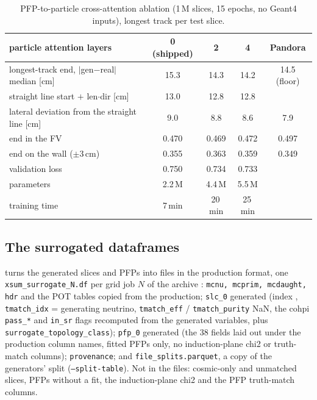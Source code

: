 \documentclass[11pt]{article}
\newcommand{\real}{Pandora}
\begin{document}
\begin{table}[h]\centering\small
\begin{tabular}{lcccc}\toprule
particle attention layers & 0 (shipped) & 2 & 4 & \real{} \\\midrule
longest-track end, $|$gen$-$real$|$ median [cm] & 15.3 & 14.3 & 14.2 & 14.5 (floor) \\
\quad straight line start $+$ len$\cdot$dir [cm] & 13.0 & 12.8 & 12.8 & \\
lateral deviation from the straight line [cm] & 9.0 & 8.8 & 8.6 & 7.9 \\
end in the FV & 0.470 & 0.469 & 0.472 & 0.497 \\
end on the wall ($\pm3$\,cm) & 0.355 & 0.363 & 0.359 & 0.349 \\
validation loss & 0.750 & 0.734 & 0.733 & \\
parameters & 2.2\,M & 4.4\,M & 5.5\,M & \\
training time & 7\,min & 20\,min & 25\,min & \\\bottomrule
\end{tabular}
\caption{PFP-to-particle cross-attention ablation (1\,M slices, 15 epochs, no Geant4 inputs), longest track per test slice.}\label{tab:attn}\end{table}
\small\normalsize
\FloatBarrier

\subsection{The surrogated dataframes}
\label{sec:dataset}

 turns the generated slices and PFPs into files in the production
format, one \texttt{xsum\_surrogate\_N.df} per grid job $N$ of the archive :
\texttt{mcnu, mcprim, mcdaught, hdr} and the POT tables copied from the production; \texttt{slc\_0} generated
(index , \texttt{tmatch\_idx} = generating neutrino,
\texttt{tmatch\_eff} / \texttt{tmatch\_purity} NaN, the cohpi \texttt{pass\_*} and \texttt{in\_sr} flags
recomputed from the generated variables, plus \texttt{surrogate\_topology\_class}); \texttt{pfp\_0} generated
(the 38 fields laid out under the production column names, fitted PFPs only, no induction-plane chi2 or
truth-match columns); \texttt{provenance}; and \texttt{file\_splits.parquet}, a copy of the generators' split
(\texttt{--split-table}). Not in the files: cosmic-only and unmatched slices, PFPs without a fit, the
induction-plane chi2 and the PFP truth-match columns.
\end{document}
